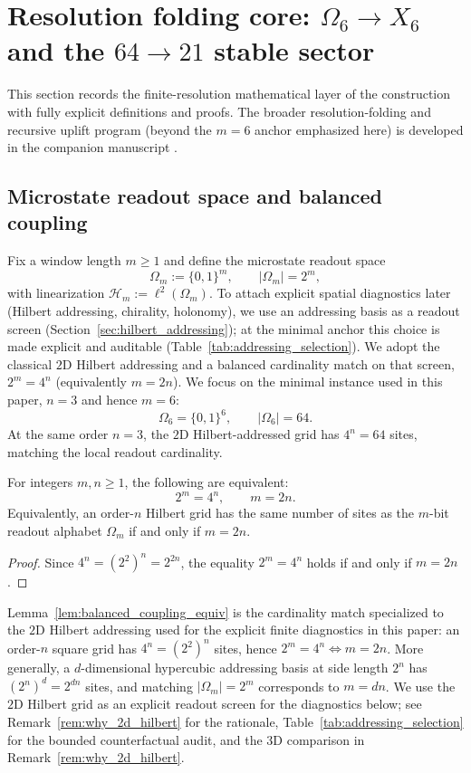 
\section{Resolution folding core: \texorpdfstring{$\Omega_6\to X_6$}{Omega6->X6} and the \texorpdfstring{$64\to 21$}{64->21} stable sector}
\label{sec:folding_core}

This section records the finite-resolution mathematical layer of the construction with fully explicit definitions and proofs.
The broader resolution-folding and recursive uplift program (beyond the $m=6$ anchor emphasized here) is developed in the companion manuscript \cite{Ma2025RF}.

\subsection{Microstate readout space and balanced coupling}
\label{subsec:microstate_space}

Fix a window length $m\ge 1$ and define the microstate readout space
\[
\Omega_m:=\{0,1\}^m,\qquad |\Omega_m|=2^m,
\]
with linearization $\mathcal{H}_m:=\ell^2(\Omega_m)$.
To attach explicit spatial diagnostics later (Hilbert addressing, chirality, holonomy), we use an addressing basis as a readout screen (Section~\ref{sec:hilbert_addressing}); at the minimal anchor this choice is made explicit and auditable (Table~\ref{tab:addressing_selection}).
We adopt the classical $2$D Hilbert addressing and a balanced cardinality match on that screen, $2^m=4^n$ (equivalently $m=2n$).
We focus on the minimal instance used in this paper, $n=3$ and hence $m=6$:
\[
\Omega_6=\{0,1\}^6,\qquad |\Omega_6|=64.
\]
At the same order $n=3$, the $2$D Hilbert-addressed grid has $4^n=64$ sites, matching the local readout cardinality.

\begin{lemma}\label{lem:balanced_coupling_equiv}
For integers $m,n\ge 1$, the following are equivalent:
\[
2^m=4^n,\qquad m=2n.
\]
Equivalently, an order-$n$ Hilbert grid has the same number of sites as the $m$-bit readout alphabet $\Omega_m$ if and only if $m=2n$.
\end{lemma}
\begin{proof}
Since $4^n=(2^2)^n=2^{2n}$, the equality $2^m=4^n$ holds if and only if $m=2n$.
\end{proof}

\begin{remark}\label{rem:balanced_coupling_dimension}
Lemma~\ref{lem:balanced_coupling_equiv} is the cardinality match specialized to the $2$D Hilbert addressing used for the explicit finite diagnostics in this paper: an order-$n$ square grid has $4^n=(2^2)^n$ sites, hence $2^m=4^n\iff m=2n$.
More generally, a $d$-dimensional hypercubic addressing basis at side length $2^n$ has $(2^n)^d=2^{dn}$ sites, and matching $|\Omega_m|=2^m$ corresponds to $m=dn$.
We use the $2$D Hilbert grid as an explicit readout screen for the diagnostics below; see Remark~\ref{rem:why_2d_hilbert} for the rationale, Table~\ref{tab:addressing_selection} for the bounded counterfactual audit, and the $3$D comparison in Remark~\ref{rem:why_2d_hilbert}.
\end{remark}

